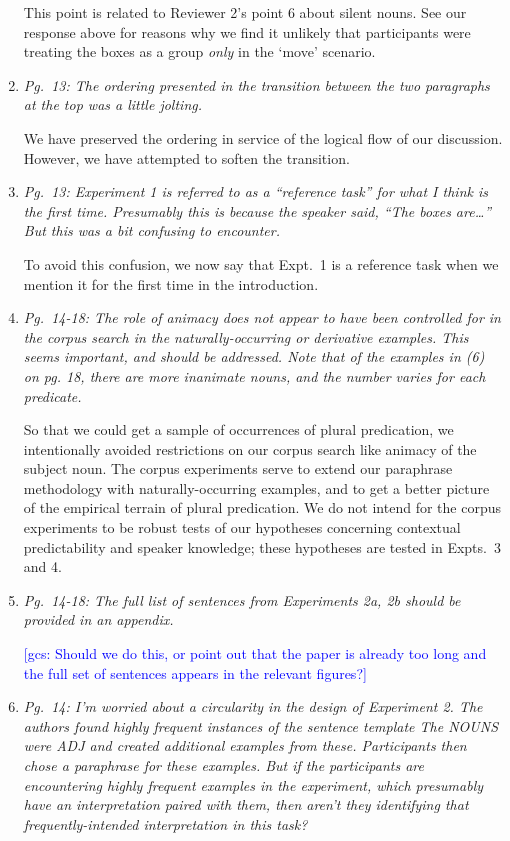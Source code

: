 \documentclass[12pt]{article}
\newcommand{\gcs}[1]{\textcolor{blue}{[gcs: #1]}}
\begin{document}
\begin{enumerate}
This point is related to Reviewer 2's point 6 about silent nouns. See our response above for reasons why we find it unlikely that participants were treating the boxes as a group \emph{only} in the `move' scenario.

\item \emph{Pg.~13: The ordering presented in the transition between the two paragraphs at the top was a little jolting.} 
	
We have preserved the ordering in service of the logical flow of our discussion. However, we have attempted to soften the transition.
	
\item \emph{Pg.~13: Experiment 1 is referred to as a ``reference task'' for what I think is the first time. Presumably this is because the speaker said, ``The boxes are\ldots'' But this was a bit confusing to encounter.}

To avoid this confusion, we now say that Expt.~1 is a reference task when we mention it for the first time in the introduction.

\item \emph{Pg.~14-18: The role of animacy does not appear to have been controlled for in the corpus search in the naturally-occurring or derivative examples. This seems important, and should be addressed. Note that of the examples in (6) on pg. 18, there are more inanimate nouns, and the number varies for each predicate.}

So that we could get a sample of occurrences of plural predication, we intentionally avoided restrictions on our corpus search like animacy of the subject noun. The corpus experiments serve to extend our paraphrase methodology with naturally-occurring examples, and to get a better picture of the empirical terrain of plural predication. We do not intend for the corpus experiments to be robust tests of our hypotheses concerning contextual predictability and speaker knowledge; these hypotheses are tested in Expts.~3 and 4.

\item \emph{Pg.~14-18: The full list of sentences from Experiments 2a, 2b should be provided in an appendix.}

\gcs{Should we do this, or point out that the paper is already too long and the full set of sentences appears in the relevant figures?}

\item \emph{Pg.~14: I'm worried about a circularity in the design of Experiment 2. The authors found highly frequent instances of the sentence template \emph{The NOUNS were ADJ} and created additional examples from these. Participants then chose a paraphrase for these examples. But if the participants are encountering highly frequent examples in the experiment, which presumably have an interpretation paired with them, then aren't they identifying that frequently-intended interpretation in this task?}


\end{enumerate}
\end{document}
